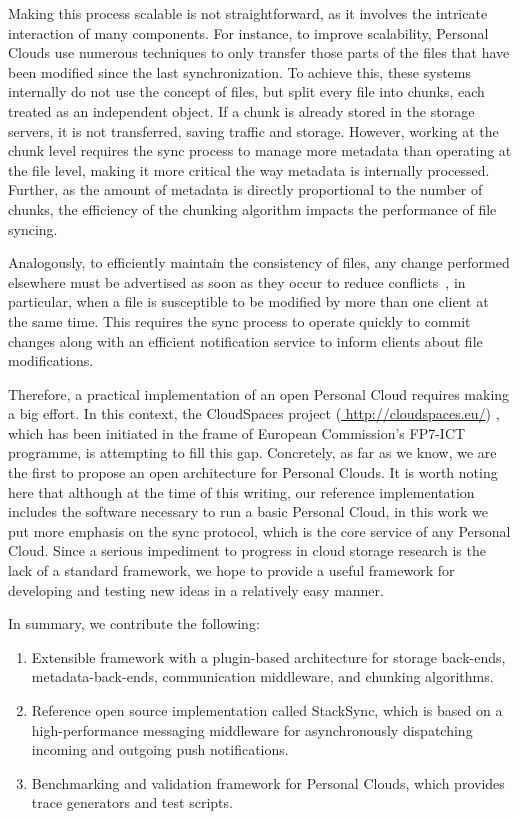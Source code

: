 Making this process scalable is not straightforward, as it involves the intricate interaction of many components. For
instance, to improve scalability, Personal Clouds use numerous techniques to only transfer those parts of the
files that have been modified since the last synchronization. To achieve this, these systems internally do not
use the concept of files, but split every file into chunks, each treated as an independent object. If a chunk
is already stored in the storage servers, it is not transferred, saving traffic and storage. However, working
at the chunk level requires the sync process to manage more metadata than operating at the file level, making
it more critical the way metadata is internally processed. Further, as the amount of metadata is directly proportional
to the number of chunks, the efficiency of the chunking algorithm impacts the performance of file syncing.

Analogously, to efficiently maintain the consistency of files, any change performed elsewhere must be advertised 
as soon as they occur to reduce conflicts~\cite{drago2012inside}, in particular, when a file is susceptible to
be modified by more than one client at the same time. This requires the sync process to operate quickly to
commit changes along with an efficient notification service to inform clients about file modifications. 

Therefore, a practical implementation of an open Personal Cloud requires making a big effort. In 
this context, the CloudSpaces project (\url{ http://cloudspaces.eu/}) , which has been initiated
in the frame of European Commission's FP7-ICT programme, is attempting to fill this gap. Concretely,
as far as we know, we are the first to propose an open architecture for Personal Clouds. It is worth
noting here that although at the time of this writing, our reference implementation includes the
software necessary to run a basic Personal Cloud, in this work we put more emphasis on the sync protocol, which
is the core service of any Personal Cloud. Since a serious impediment to progress in cloud storage
research is the lack of a standard framework, we hope to provide a useful framework for developing
and testing new ideas in a relatively easy manner.

In summary, we contribute the following:

\begin{enumerate}
\item Extensible framework with a plugin-based architecture for  storage back-ends, metadata-back-ends,
 communication middleware, and chunking  algorithms.
\item Reference open source implementation called StackSync, which is based on a high-performance messaging middleware 
for asynchronously dispatching incoming and outgoing push notifications.
\item Benchmarking and validation framework for Personal Clouds, which provides trace generators and test scripts. 

\end{enumerate}


